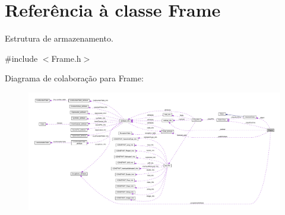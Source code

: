 \hypertarget{classFrame}{}\section{Referência à classe Frame}
\label{classFrame}


Estrutura de armazenamento.  




{\ttfamily \#include $<$Frame.\+h$>$}



Diagrama de colaboração para Frame\+:
\nopagebreak
\begin{figure}[H]
\begin{center}
\leavevmode
\includegraphics[width=350pt]{classFrame__coll__graph}
\end{center}
\end{figure}
